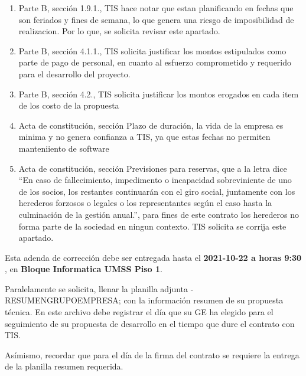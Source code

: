 \documentclass[10pt,letterpaper]{article}
\begin{document}
	\begin{enumerate}
\item Parte B, sección 1.9.1., TIS hace notar que estan planificando en fechas que son feriados y fines de semana,
lo que genera una riesgo de imposibilidad de realizacion. Por lo que, se solicita revisar este apartado.
\item Parte B, sección 4.1.1., TIS solicita justificar los montos estipulados como parte de pago de personal, en
cuanto al esfuerzo comprometido y requerido para el desarrollo del proyecto.
\item Parte B, sección 4.2., TIS solicita justificar los montos erogados en cada item de los costo de la propuesta
\item Acta de constitución, sección Plazo de duración, la vida de la empresa es minima y no genera
confianza a TIS, ya que estas fechas no permiten manteniiento de software

\item Acta de constitución, sección Previsiones para reservas, que a la letra dice “En caso de fallecimiento, impedimento o incapacidad sobreviniente de uno de los socios, los restantes continuarán con
el giro social, juntamente con los herederos forzosos o legales o los representantes según el caso hasta la
culminación de la gestión anual.”, para fines de este contrato los herederos no forma parte de la sociedad
en ningun contexto. TIS solicita se corrija este apartado.
	\end{enumerate}
Esta adenda de corrección debe ser entregada hasta el \textbf{2021-10-22 a horas 9:30} , en \textbf{ Bloque Informatica UMSS Piso 1}.


Paralelamente se solicita, llenar la planilla adjunta - RESUMENGRUPOEMPRESA; con la información resumen de su propuesta técnica. En este archivo debe registrar el día que su GE ha elegido para el seguimiento de su propuesta de desarrollo en el tiempo que dure el contrato con TIS.


Asímismo, recordar que para el día de la firma del contrato se requiere la entrega de la planilla resumen requerida.
\end{document}
